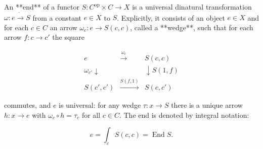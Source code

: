 An **end** of a functor $S: C^{\text{op}} \times C \rightarrow X$ is a universal dinatural transformation $\omega: e \mathbin{\dot{\rightarrow}} S$ from a constant $e \in X$ to $S$. Explicitly, it consists of an object $e \in X$ and for each $c \in C$ an arrow $\omega_c: e \rightarrow S(c, c)$, called a **wedge**, such that for each arrow $f: c \rightarrow c'$ the square

$$\begin{array}{ccc}
e & \xrightarrow{\omega_c} & S(c, c) \\
\omega_{c'} \downarrow & & \downarrow S(1, f) \\
S(c', c') & \xrightarrow{S(f, 1)} & S(c, c')
\end{array}$$

commutes, and $e$ is universal: for any wedge $\tau: x \rightarrow S$ there is a unique arrow $h: x \rightarrow e$ with $\omega_c \circ h = \tau_c$ for all $c \in C$. The end is denoted by integral notation:

$$e = \int_c S(c, c) = \operatorname{End} S.$$
